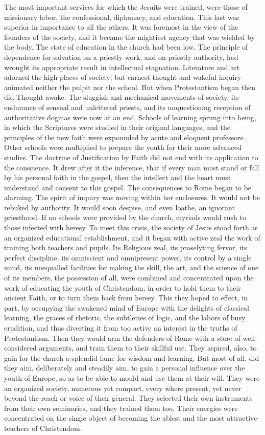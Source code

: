 \documentclass[]{book}
\begin{document}
The most important services for which the Jesuits were trained, were those of missionary labor, the confessional, diplomacy, and education. This last was superior in importance to all the others. It was foremost in the view of the founders of the society, and it became the mightiest agency that was wielded by the body. The state of education in the church had been low. The principle of dependence for salvation on a priestly work, and on priestly authority, had wrought its appropriate result in intellectual stagnation. Literature and art adorned the high places of society; but earnest thought and wakeful inquiry animated neither the pulpit nor the school. But when Protestantism began then did Thought awake. The sluggish and mechanical movements of society, its endurance of sensual and unlettered priests, and its unquestioning reception of authoritative dogmas were now at an end. Schools of learning sprung into being, in which the Scriptures were studied in their original languages, and the principles of the new faith were expounded by acute and eloquent professors. Other schools were multiplied to prepare the youth for their more advanced studies. The doctrine of Justification by Faith did not end with its application to the conscience. It drew after it the inference, that if every man must stand or fall by his personal faith in the gospel, then the intellect and the heart must understand and consent to this gospel. The consequences to Rome began to be alarming. The spirit of inquiry was moving within her enclosures. It would not be rebuked by authority. It would soon despise, and even loathe, an ignorant priesthood. If no schools were provided by the church, myriads would rush to those infected with heresy. To meet this crisis, the society of Jesus stood forth as an organized educational establishment, and it began with active zeal the work of training both teachers and pupils. Its Religious zeal, its proselyting fervor, its perfect discipline, its omniscient and omnipresent power, its control by a single mind, its unequalled facilities for making the skill, the art, and the science of one of its members, the possession of all, were combined and concentrated upon the work of educating the youth of Christendom, in order to hold them to their ancient Faith, or to turn them back from heresy. This they hoped to effect, in part, by occupying the awakened mind of Europe with the delights of classical learning, the graces of rhetoric, the subtleties of logic, and the labors of busy erudition, and thus diverting it from too active an interest in the truths of Protestantism. Then they would arm the defenders of Rome with a store of well-considered arguments, and train them to their skillful use. They aspired, also, to gain for the church a splendid fame for wisdom and learning. But most of all, did they aim, deliberately and steadily aim, to gain a personal influence over the youth of Europe, so as to be able to mould and use them at their will. They were an organized society, numerous yet compact, every where present, yet never beyond the reach or voice of their general. They selected their own instruments from their own seminaries, and they trained them too. Their energies were concentrated on the single object of becoming the ablest and the most attractive teachers of Christendom. 
\end{document}
